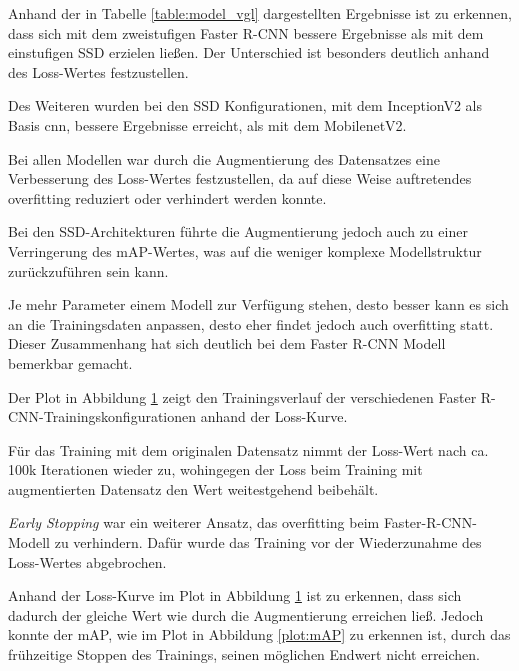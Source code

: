 Anhand der in Tabelle \ref{table:model_vgl} dargestellten 
Ergebnisse ist zu erkennen, dass sich mit dem zweistufigen 
Faster R-CNN bessere Ergebnisse als mit dem einstufigen
SSD erzielen ließen.
Der Unterschied ist besonders deutlich anhand des Loss-Wertes 
festzustellen.

Des Weiteren wurden bei den SSD Konfigurationen, mit dem 
InceptionV2
als Basis \Gls{cnn}, bessere Ergebnisse erreicht, als mit dem 
MobilenetV2.

Bei allen Modellen war durch die Augmentierung des 
Datensatzes eine Verbesserung des Loss-Wertes festzustellen, 
da auf diese Weise auftretendes \Gls{overfitting} reduziert
oder verhindert werden konnte.

Bei den SSD-Architekturen führte die Augmentierung
jedoch auch zu einer Verringerung des mAP-Wertes, 
was auf die weniger komplexe Modellstruktur zurückzuführen sein kann.

Je mehr Parameter einem Modell zur Verfügung stehen, desto besser kann 
es sich an die Trainingsdaten anpassen, desto eher findet jedoch
auch \Gls{overfitting} statt.
Dieser Zusammenhang hat sich deutlich bei dem Faster R-CNN 
Modell bemerkbar gemacht.

Der Plot in Abbildung \ref{plot:loss} zeigt den Trainingsverlauf
der verschiedenen Faster R-CNN-Trainingskonfigurationen
anhand der Loss-Kurve.

Für das Training mit dem originalen Datensatz nimmt der Loss-Wert
nach ca. 100k Iterationen wieder zu, wohingegen der Loss beim Training 
mit augmentierten Datensatz den Wert weitestgehend beibehält.

\textit{Early Stopping} war ein weiterer Ansatz, das 
\Gls{overfitting} beim Faster-R-CNN-Modell zu verhindern.
Dafür wurde das Training vor der Wiederzunahme des Loss-Wertes 
abgebrochen.

Anhand der Loss-Kurve im Plot in Abbildung \ref{plot:loss} 
ist zu erkennen, dass sich dadurch der gleiche
Wert wie durch die Augmentierung erreichen ließ.
Jedoch konnte der mAP, wie im Plot in Abbildung \ref{plot:mAP}
zu erkennen ist, durch das frühzeitige Stoppen des 
Trainings, seinen möglichen Endwert nicht erreichen.


\vspace{0.5cm}
\begin{figure}[H]
\begin{minipage}{0.5\textwidth}
  \centering
  \def\svgwidth{0.95\textwidth}
  
  \label{plot:mAP}
\end{minipage}
\begin{minipage}{0.5\textwidth}
  \centering
  \def\svgwidth{0.95\textwidth}
  
  \label{plot:loss}
\end{minipage}
\end{figure}

